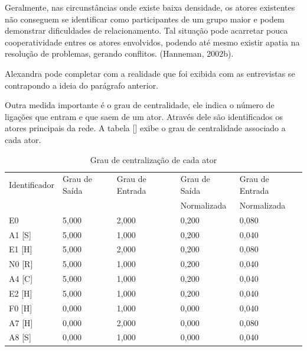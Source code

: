 Geralmente, nas circunstâncias onde existe baixa densidade, os atores existentes não conseguem se identificar como participantes de um grupo maior e podem demonstrar  dificuldades de relacionamento. Tal situação pode acarretar pouca cooperatividade entres os atores envolvidos, podendo até mesmo existir apatia na resolução de problemas, gerando conflitos. (Hanneman, 2002b).

Alexandra pode completar com a realidade que foi exibida com as entrevistas se contrapondo a ideia do parágrafo anterior.

Outra medida importante é o grau de centralidade, ele indica o número de ligações que entram e que saem de um ator. Através dele são identificados os atores principais da rede. A tabela [] exibe o grau de centralidade associado a cada ator.

\begin{table}[]
\centering
\caption{Grau de centralização de cada ator}
\label{table-centralize-degree}
\begin{tabular}{|l|l|l|l|l|}
\hline
Identificador & Grau de Saída & Grau de Entrada & Grau de Saída  & Grau de Entrada \\ 
	      &               &                 & Normalizada    & Normalizada \\ \hline
E0            & 5,000         & 2,000           & 0,200                     & 0,080                       \\ \hline
A1 {[}S{]}    & 5,000         & 1,000           & 0,200                     & 0,040                       \\ \hline
E1 {[}H{]}    & 5,000         & 2,000           & 0,200                     & 0,080                       \\ \hline
N0 {[}R{]}    & 5,000         & 1,000           & 0,200                     & 0,040                       \\ \hline
A4 {[}C{]}    & 5,000         & 1,000           & 0,200                     & 0,040                       \\ \hline
E2 {[}H{]}    & 5,000         & 1,000           & 0,200                     & 0,040                       \\ \hline
F0 {[}H{]}    & 0,000         & 1,000           & 0,000                     & 0,040                       \\ \hline
A7 {[}H{]}    & 0,000         & 2,000           & 0,000                     & 0,080                       \\ \hline
A8 {[}S{]}    & 0,000         & 1,000           & 0,000                     & 0,040                       \\ \hline

\end{tabular}
\end{table}
